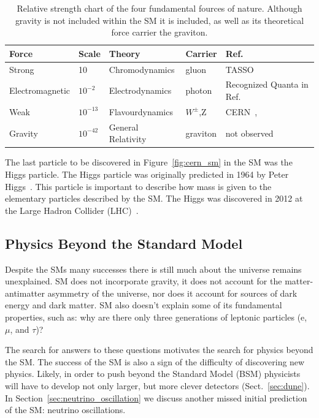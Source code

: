 \begin{table}
\begin{center}
\begin{tabular}{||p{30mm} p{20mm} p{40mm} p{25mm} p{35mm}||}
 \hline
 Force & Scale & Theory & Carrier & Ref. \\ [0.5ex]
 \hline\hline
 Strong & 10 & Chromodynamics & gluon & TASSO~\citep{tasso_1978_BRANDELIK1979243, PETRA_PhysRevLett.43.830} \\
 \hline
 Electromagnetic & $10^{-2} $ & Electrodynamics & photon & Recognized Quanta in Ref.~\citep{https://doi.org/10.1002/andp.19053220607} \\
 \hline
 Weak & $10^{-13}$ & Flavourdynamics & $W^{\pm}$,Z & CERN~\citep{wboson_measure_ARNISON1983103},\citep{zboson_measure_1983398}\\
 \hline
 Gravity & $10^{-42}$ & General Relativity & graviton  & not observed \\
 \hline
 \hline
\end{tabular}
\caption{Relative strength chart of the four fundamental fources of nature. 
Although gravity is not included within the SM it is included, as well as its theoretical force carrier the graviton.
}
\label{table:forces}
\end{center}
\end{table}

The last particle to be discovered in Figure~\ref{fig:cern_sm} in the SM was the Higgs particle.
The Higgs particle was originally predicted in 1964 by Peter Higgs~\citep{HIGGS1964132}.
This particle is important to describe how mass is given to the elementary particles described by the SM.
The Higgs was discovered in 2012 at the Large Hadron Collider (LHC)~\citep{higgs_discovery_20121}.

\subsection{Physics Beyond the Standard Model}

Despite the SMs many successes there is still much about the universe remains unexplained.
SM does not incorporate gravity, it does not account for the matter-antimatter asymmetry of the universe, nor does it account for sources of dark energy and dark matter.
SM also doesn't explain some of its fundamental properties, such as: why are there only three generations of leptonic particles (e, $\mu$, and $\tau$)?

The search for answers to these questions motivates the search for physics beyond the SM.
The success of the SM is also a sign of the difficulty of discovering new physics.
Likely, in order to push beyond the Standard Model (BSM) physicists will have to develop not only larger, but more clever detectors (Sect.~\ref{sec:dune}).
In Section~\ref{sec:neutrino_oscillation} we discuss another missed initial prediction of the SM: neutrino oscillations. 

